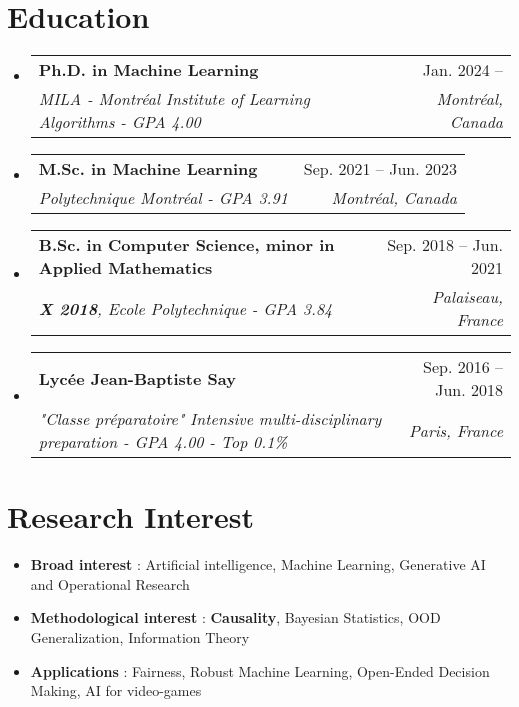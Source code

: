 \documentclass[letterpaper,11pt]{article}
\makeatletter
\newcommand{\resumeSubheading}[4]{
  \vspace{-2pt}\item
    \begin{tabular*}{0.97\textwidth}[t]{l@{\extracolsep{\fill}}r}
      \textbf{#1} & #2 \\
      \textit{\small#3} & \textit{\small #4} \\
    \end{tabular*}\vspace{-7pt}
}
\newcommand{\resumeSubHeadingListStart}{\begin{itemize}[leftmargin=0.15in, label={}]}
\newcommand{\resumeSubHeadingListEnd}{\end{itemize}}
\makeatother
\begin{document}
\section{Education}
  \resumeSubHeadingListStart
        \resumeSubheading
      {Ph.D. in Machine Learning}{Jan. 2024 -- }
      {MILA - Montréal Institute of Learning Algorithms - GPA 4.00}{Montréal, Canada}
      \vspace{.2pt}
      \resumeSubheading
      {M.Sc. in Machine Learning}{Sep. 2021 -- Jun. 2023}
      {Polytechnique Montréal - GPA 3.91}{Montréal, Canada}
      \vspace{.2pt}
    \resumeSubheading
      {B.Sc. in Computer Science, minor in Applied Mathematics}{Sep. 2018 -- Jun. 2021}
      {\textbf{X 2018}, Ecole Polytechnique - GPA 3.84}{Palaiseau, France}
    \resumeSubheading
      {Lycée Jean-Baptiste Say}{Sep. 2016 -- Jun. 2018}
      {"Classe préparatoire" Intensive multi-disciplinary preparation - GPA 4.00 - Top 0.1\% }{Paris, France}
      
  \resumeSubHeadingListEnd
\section{Research Interest}
        \begin{itemize}
            \item \textbf{Broad interest} : Artificial intelligence, Machine Learning, Generative AI and Operational Research
            \vspace{-5pt}
            \item \textbf{Methodological interest} : \textbf{Causality}, Bayesian Statistics, OOD Generalization, Information Theory
            \vspace{-5pt}
            \item \textbf{Applications} : Fairness, Robust Machine Learning, Open-Ended Decision Making, AI for video-games
        \end{itemize}
\end{document}
